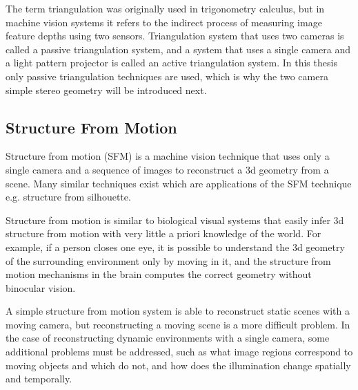 \documentclass[12pt,a4paper,oneside,pdftex]{report}
\begin{document}
The term triangulation was originally used in trigonometry calculus, but in machine vision systems it refers to the indirect process of measuring image feature depths using two sensors. Triangulation system that uses two cameras is called a passive triangulation system, and a system that uses a single camera and a light pattern projector is called an active triangulation system. In this thesis only passive triangulation techniques are used, which is why the two camera simple stereo geometry will be introduced next.

\subsection{Structure From Motion}
\label{subsection:structure_from_motion}

Structure from motion (SFM) is a machine vision technique that uses only a single camera and a sequence of images to  reconstruct a 3d geometry from a scene. Many similar techniques exist which are applications of the SFM technique e.g. structure from silhouette.

Structure from motion is similar to biological visual systems that easily infer 3d structure from motion with very little a priori knowledge of the world. For example, if a person closes one eye, it is possible to understand the 3d geometry of the surrounding environment only by moving in it, and the structure from motion mechanisms in the brain computes the correct geometry without binocular vision.

A simple structure from motion system is able to reconstruct static scenes with a moving camera, but reconstructing a moving scene is a more difficult problem. In the case of reconstructing dynamic environments with a single camera, some additional problems must be addressed, such as what image regions correspond to moving objects and which do not, and how does the illumination change spatially and temporally.


\end{document}
